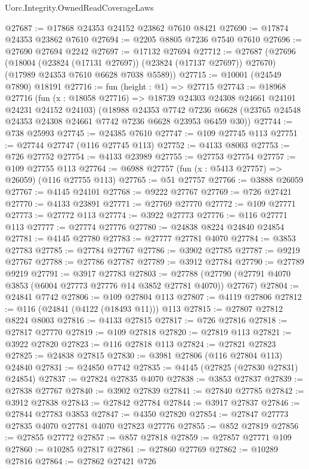 \begin{lexlean}{Uorc.Integrity.OwnedReadCoverageLaws}
\begin{coremodule}
@27687 := @17868 @24353 @24152 @23862 @7610 @8421
@27690 := @17874 @24353 @23862 @7610
@27694 := @2205 @8805 @7236 @7540 @7610
@27696 := @27690 @27694 @2242
@27697 := @17132 @27694
@27712 := @27687
    (@27696
      (@18004 (@23824 (@17131 @27697)) (@23824 (@17137 @27697)) @27670)
      (@17989 @24353 @7610 @6628 @7038 @5589))
@27715 := @10001 (@24549 @7890) @18191
@27716 := fun (height : @1) => @27715
@27743 := @18968
    @27716
    (fun (x : @18058 @27716) => @18739 @24303 @24308 @24661 @24101 @24231 @24152 @24103)
    (@18988
      @24353
      @7742
      @7236
      @6628
      (@23765 @24548 @24353 @24308 @24661 @7742 @7236 @6628 @23953 @6459 @30))
@27744 := @738 @25993
@27745 := @24385 @7610
@27747 := @109 @27745 @113
@27751 := @27744 @27747 (@116 @27745 @113)
@27752 := @4133 @8003
@27753 := @726 @27752
@27754 := @4133 @23989
@27755 := @27753 @27754
@27757 := @109 @27755 @113
@27764 := @6988 @27757 (fun (x : @5413 @27757) => @26059) (@116 @27755 @113)
@27765 := @51 @27757
@27766 := @3888 @26059
@27767 := @4145 @24101
@27768 := @9222 @27767
@27769 := @726 @27421
@27770 := @4133 @23891
@27771 := @27769 @27770
@27772 := @109 @27771
@27773 := @27772 @113
@27774 := @3922 @27773
@27776 := @116 @27771 @113
@27777 := @27774 @27776
@27780 := @24838 @8224 @24840 @24854
@27781 := @4145 @27780
@27783 := @27777 @27781 @4070
@27784 := @3853 @27783
@27785 := @27784 @27767
@27786 := @3902 @27785
@27787 := @9219 @27767
@27788 := @27786 @27787
@27789 := @3912 @27784
@27790 := @27789 @9219
@27791 := @3917 @27783
@27803 := @27788 (@27790 (@27791 @4070 @3853 (@6004 @27773 @27776 @14 @3852 @27781 @4070)) @27767)
@27804 := @24841 @7742
@27806 := @109 @27804 @113
@27807 := @4119 @27806
@27812 := @116 (@24841 (@4122 (@18493 @11))) @113
@27815 := @27807 @27812 @8224 @8003
@27816 := @4133 @27815
@27817 := @726 @27816
@27818 := @27817 @27770
@27819 := @109 @27818
@27820 := @27819 @113
@27821 := @3922 @27820
@27823 := @116 @27818 @113
@27824 := @27821 @27823
@27825 := @24838 @27815
@27830 := @3981 @27806 (@116 @27804 @113) @24840
@27831 := @24850 @7742
@27835 := @4145 (@27825 (@27830 @27831) @24854)
@27837 := @27824 @27835 @4070
@27838 := @3853 @27837
@27839 := @27838 @27767
@27840 := @3902 @27839
@27841 := @27840 @27785
@27842 := @3912 @27838
@27843 := @27842 @27784
@27844 := @3917 @27837
@27846 := @27844 @27783 @3853
@27847 := @4350 @27820
@27854 := @27847 @27773 @27835 @4070 @27781 @4070 @27823 @27776
@27855 := @852 @27819
@27856 := @27855 @27772
@27857 := @857 @27818
@27859 := @27857 @27771 @109
@27860 := @10285 @27817
@27861 := @27860 @27769
@27862 := @10289 @27816
@27864 := @27862 @27421 @726

\end{coremodule}
\end{lexlean}

